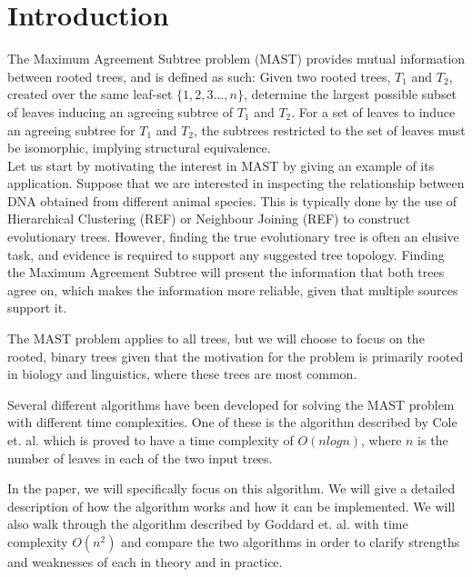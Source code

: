 \chapter{Introduction}
\label{ch:intro}
The Maximum Agreement Subtree problem (MAST) provides mutual information between rooted trees, and is defined as such: Given two rooted trees, $T_1$ and $T_2$, created over the same leaf-set $\{1,2,3...,n\}$, determine the largest possible subset of leaves inducing an agreeing subtree of $T_1$ and $T_2$. For a set of leaves to induce an agreeing subtree for $T_1$ and $T_2$, the subtrees restricted to the set of leaves must be isomorphic, implying structural equivalence.
\\

Let us start by motivating the interest in MAST by giving an example of its application. Suppose that we are interested in inspecting the relationship between DNA obtained from different animal species. This is typically done by the use of  Hierarchical Clustering (REF) or Neighbour Joining (REF) to construct evolutionary trees. However, finding the true evolutionary tree is often an elusive task, and evidence is required to support any suggested tree topology. Finding the Maximum Agreement Subtree will present the information that both trees agree on, which makes the information more reliable, given that multiple sources support it. 

The MAST problem applies to all trees, but we will choose to focus on the rooted, binary trees given that the motivation for the problem is primarily rooted in biology and linguistics, where these trees are most common.

Several different algorithms have been developed for solving the MAST problem with different time complexities. One of these is the algorithm described by Cole et. al. \cite{nlogn} which is proved to have a time complexity of $O(nlogn)$, where $n$ is the number of leaves in each of the two input trees.

In the paper, we will specifically focus on this algorithm. We will give a detailed description of how the algorithm works and how it can be implemented. We will also walk through the algorithm described by Goddard et. al.\cite{nsquared} with time complexity $O(n^2)$ and compare the two algorithms in order to clarify strengths and weaknesses of each in theory and in practice.


